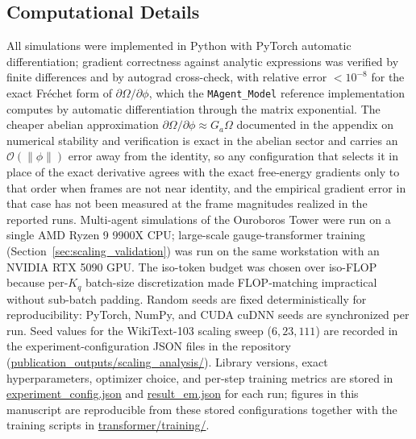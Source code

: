 \documentclass[11pt]{article}
\begin{document}
\subsection{Computational Details}
All simulations were implemented in Python with PyTorch automatic differentiation; gradient correctness against analytic expressions was verified by finite differences and by autograd cross-check, with relative error $<10^{-8}$ for the exact Fr\'echet form of $\partial\Omega/\partial\phi$, which the \texttt{MAgent\_Model} reference implementation computes by automatic differentiation through the matrix exponential. The cheaper abelian approximation $\partial\Omega/\partial\phi \approx G_a\Omega$ documented in the appendix on numerical stability and verification is exact in the abelian sector and carries an $\mathcal{O}(\|\phi\|)$ error away from the identity, so any configuration that selects it in place of the exact derivative agrees with the exact free-energy gradients only to that order when frames are not near identity, and the empirical gradient error in that case has not been measured at the frame magnitudes realized in the reported runs. Multi-agent simulations of the Ouroboros Tower were run on a single AMD Ryzen 9 9900X CPU; large-scale gauge-transformer training (Section~\ref{sec:scaling_validation}) was run on the same workstation with an NVIDIA RTX 5090 GPU. The iso-token budget was chosen over iso-FLOP because per-$K_q$ batch-size discretization made FLOP-matching impractical without sub-batch padding. Random seeds are fixed deterministically for reproducibility: PyTorch, NumPy, and CUDA cuDNN seeds are synchronized per run. Seed values for the WikiText-103 scaling sweep ($6, 23, 111$) are recorded in the experiment-configuration JSON files in the repository (\url{publication_outputs/scaling_analysis/}). Library versions, exact hyperparameters, optimizer choice, and per-step training metrics are stored in \url{experiment_config.json} and \url{result_em.json} for each run; figures in this manuscript are reproducible from these stored configurations together with the training scripts in \url{transformer/training/}.
\end{document}
